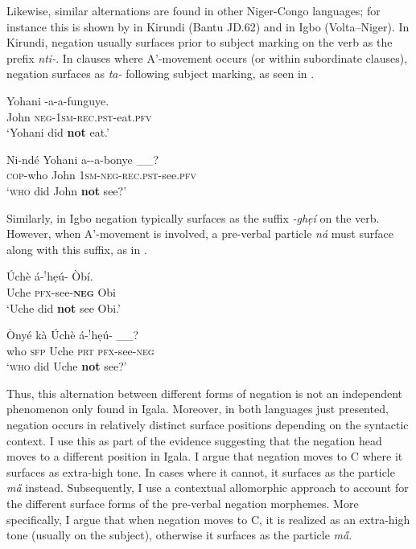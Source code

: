 \documentclass[output=paper,colorlinks,citecolor=brown,
]{langscibook}
\begin{document}
Likewise, similar alternations are found in other Niger-Congo languages; for instance this is shown by \citet{chaperon2022} in Kirundi (Bantu JD.62) and \citet{amaechiinteraction} in Igbo (Volta–Niger). In Kirundi, negation usually surfaces prior to subject marking on the verb as the prefix \textit{nti-}. In clauses where A'-movement occurs (or within subordinate clauses), negation surfaces as \textit{ta-} following subject marking, as seen in .

\ea  \label{ex:chaperon:kirneg}
\begin{xlist}
\ex\gll Yohani -a-a-funguye.\\
        John {\textsc{neg}}-1\textsc{sm}-\textsc{rec.pst}-eat.{\textsc{pfv}}\\
        \glt `Yohani did \textbf{not} eat.’
        
    \ex\gll Ni-nd\'{e}          Yohani         a--a-bonye \_\_?\\
    \textsc{cop}-who    John        1\textsc{sm}-\textsc{neg}-\textsc{rec.pst}-see.{\textsc{pfv}} {}\\
    \glt `\textsc{who} did John \textbf{not} see?' \hfill \citep[Kirundi;][]{chaperon2022}
\end{xlist}
\z

Similarly, in Igbo negation typically surfaces as the suffix \textit{-ghẹ{\'{i}}} on the verb. However, when A'-movement is involved, a pre-verbal particle \textit{n\'{a}} must surface along with this suffix, as in .

\ea \label{ex:amaechi:igboneg}
\begin{xlist}
\ex\gll  Úchè \'{a}-$^!$hẹ{ú}- Òb\'{i}.\\
            Uche \textsc{pfx}-see-\textbf{\textsc{neg}} Obi\\
           \glt  `Uche did \textbf{not} see Obi.'
           
     \ex\gll Ònyé k\`{a} Úchè  \'{a}-$^!$hẹ{ú}- \_\_?\\
        who \textsc{sfp} Uche \textsc{prt} \textsc{pfx}-see-\textsc{neg}\\
        \glt `\textsc{who} did Uche \textbf{not} see?' \hfill \citep[Igbo;][]{amaechiinteraction}
\end{xlist}
\z

Thus, this alternation between different forms of negation is not an independent phenomenon only found in Igala. Moreover, in both languages just presented, negation occurs in relatively distinct surface positions depending on the syntactic context. I use this as part of the evidence suggesting that the negation head moves to a different position in Igala. I argue that negation moves to C\xhead{} where it surfaces as extra-high tone. In cases where it cannot, it surfaces as the particle \textit{m\H{a}} instead. Subsequently, I use a contextual allomorphic approach to account for the different surface forms of the pre-verbal negation morphemes. More specifically, I argue that when negation moves to C, it is realized as an extra-high tone (usually on the subject), otherwise it surfaces as the particle \textit{m\H{a}}.  
\end{document}
